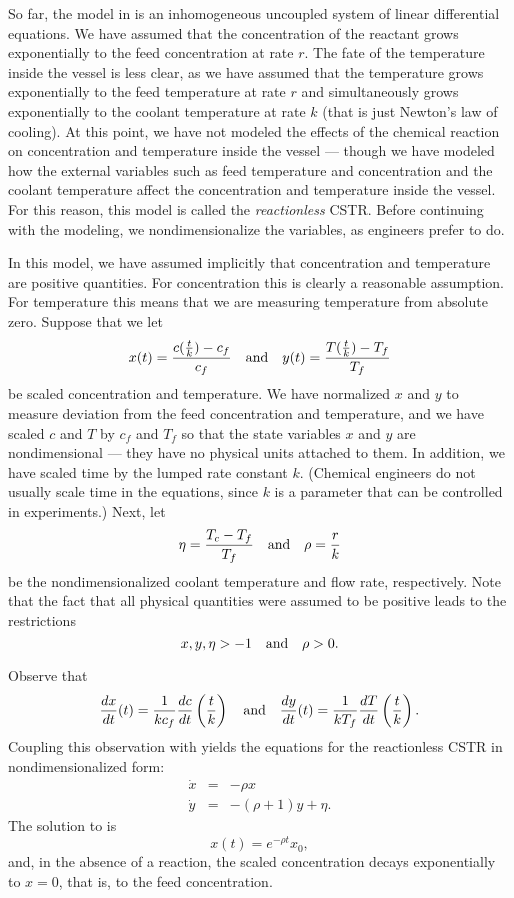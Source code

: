 \documentclass{ximera}
\begin{document}
So far, the model in  is an inhomogeneous uncoupled system
of linear differential equations.  We have assumed that the concentration 
of the reactant grows exponentially to the feed concentration at rate
$r$.  The fate of the temperature inside the vessel is less
clear, as we have assumed that the temperature grows exponentially to 
the feed temperature at rate $r$ and simultaneously grows
exponentially to the coolant temperature at rate $k$ (that is
just Newton's law of cooling).  
At this point, we have not modeled the effects of the chemical reaction 
on concentration and temperature inside the vessel --- though we have modeled 
how the external variables such as feed temperature and concentration and 
the coolant temperature affect the concentration and temperature inside the 
vessel.  For this reason, this model is called the {\em reactionless\/} CSTR. 
Before continuing with the modeling, we 
nondimensionalize the variables, as 
engineers prefer to do.

In this model, we have assumed implicitly that concentration and
temperature are positive quantities.  For concentration this is
clearly a reasonable assumption.  For temperature this means
that we are measuring temperature from absolute zero.  Suppose
that we let  
\[
x(t) = \frac{c(\frac{t}{k})-c_f}{c_f} \quad\mbox{and}\quad 
y(t) = \frac{T(\frac{t}{k})-T_f}{T_f}
\]
be scaled concentration and temperature.  We have normalized $x$
and $y$ to measure deviation from the feed concentration and
temperature, and we have scaled $c$ and $T$ by $c_f$ and $T_f$
so that the state variables $x$ and $y$ are nondimensional ---
they have no physical units attached to them.  In addition, we
have scaled time by the lumped rate constant $k$.  (Chemical engineers
do not usually scale time in the equations, since $k$ is a 
parameter that can be controlled in experiments.) Next, let 
\[
\eta = \frac{T_c-T_f}{T_f} \quad\mbox{and}\quad \rho = \frac{r}{k}
\]
be the nondimensionalized coolant temperature and flow rate,
respectively.  Note that the fact that all physical quantities
were assumed to be positive leads to the restrictions
\[
x, y,\eta >-1  \quad\mbox{and}\quad \rho>0.
\]

Observe that 
\[
\frac{dx}{dt}(t)=\frac{1}{kc_f}\frac{dc}{dt}\left(\frac{t}{k}\right) \quad\mbox{and}\quad
\frac{dy}{dt}(t)=\frac{1}{kT_f}\frac{dT}{dt}\left(\frac{t}{k}\right).
\]
Coupling this observation with  yields the equations 
for the reactionless CSTR in nondimensionalized form:
\begin{eqnarray}
\dot{x} & = & -\rho x \label{e:ndCSTRlina} \\
\dot{y} & = & -(\rho+1)y + \eta. \label{e:ndCSTRlinb}
\end{eqnarray}
The solution to  is 
\[
x(t) = e^{-\rho t}x_0,
\]
and, in the absence of a reaction, the scaled concentration
decays exponentially to $x=0$, that is, to the feed
concentration.
\end{document}
